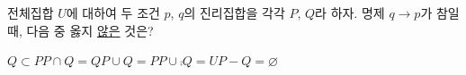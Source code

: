 전체집합 $U$에 대하여 두 조건 $p$, $q$의 진리집합을 각각 $P$, $Q$라 하자. 명제 $q\longrightarrow p$가 참일 때, 다음 중 옳지 \underline{않은} 것은? 
\begin{choices32}{$Q\subset P$}{$P\cap Q=Q$}{$P\cup Q=P$}{$P\cup\comp{Q}=U$}{$P-Q=\varnothing$}\end{choices32}
